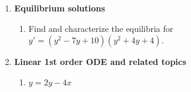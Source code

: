 \documentclass[letterpaper, fontsize=12pt]{scrartcl} %
\numberwithin{equation}{section} %
\numberwithin{figure}{section} %
\numberwithin{table}{section} %
\begin{document}
\begin{enumerate}
\begin{enumerate}[label = (\alph*)]
\end{enumerate}


\item \textbf{Equilibrium solutions} 
\begin{enumerate}[label = (\alph*)]
\item Find and characterize the equilibria for $y' = (y^2-7y + 10)(y^2 + 4y + 4)$. 

%
%
%

%


\end{enumerate}

\item \textbf{Linear 1st order ODE and related topics}
\begin{enumerate}[label = (\alph*)]
\item $y = 2y - 4x$
%


\end{enumerate}
\end{enumerate}
\end{document}
